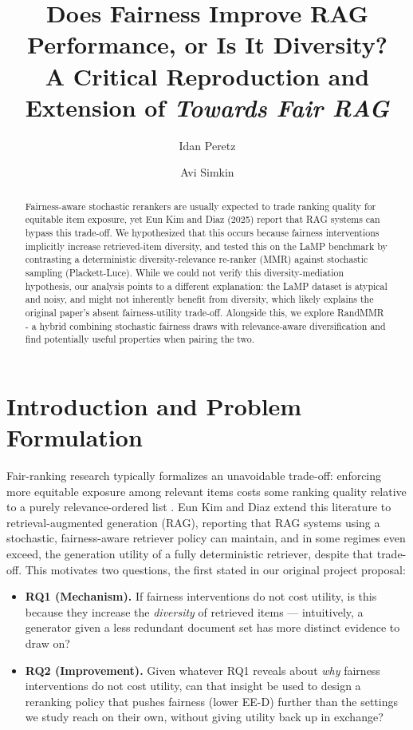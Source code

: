 \documentclass[10pt,twocolumn]{article}
\title{\vspace{-1.2em}Does Fairness Improve RAG Performance, or Is It Diversity?\\
\large A Critical Reproduction and Extension of \emph{Towards Fair RAG}\vspace{-0.3em}}
\author{Idan Peretz}
\author{Avi Simkin}
\affil{\normalsize \{308560150, 312485816\}}
\date{}
\begin{document}
\maketitle
\vspace{-2.2em}

\begin{abstract}
\noindent
Fairness-aware stochastic rerankers are usually expected to trade ranking quality for equitable item exposure,
yet Eun Kim and Diaz (2025) report that RAG systems can  bypass this trade-off.
We hypothesized that this occurs because fairness interventions implicitly increase retrieved-item diversity,
and tested this on the LaMP benchmark by contrasting a deterministic diversity-relevance re-ranker (MMR) against stochastic sampling (Plackett-Luce).
While we could not verify this diversity-mediation hypothesis, our analysis points to a different explanation: the LaMP dataset is atypical and noisy,
and might not inherently benefit from diversity, which likely explains the original paper's absent fairness-utility trade-off.
Alongside this, we explore RandMMR - a hybrid combining stochastic fairness draws with relevance-aware diversification and find potentially useful properties when pairing the two.\end{abstract}
\vspace{0.3em}

\section{Introduction and Problem Formulation}
\label{sec:intro}

Fair-ranking research typically formalizes an unavoidable trade-off: enforcing more
equitable exposure among relevant items costs some ranking quality relative to a
purely relevance-ordered list \cite{castillo2018fairness,diaz2020evaluating}.
Eun Kim and Diaz \cite{eunkim2025fairrag} extend this literature to
retrieval-augmented generation (RAG), reporting that RAG systems using a stochastic,
fairness-aware retriever policy can maintain, and in some regimes even exceed, the
generation utility of a fully deterministic retriever, despite that trade-off. This
motivates two questions, the first stated in our original project proposal:

\begin{itemize}[leftmargin=1.1em]
  \item \textbf{RQ1 (Mechanism).} If fairness interventions do not cost utility, is
  this because they increase the \emph{diversity} of retrieved items --- intuitively,
  a generator given a less redundant document set has more distinct evidence to draw
  on?
  \item \textbf{RQ2 (Improvement).} Given whatever RQ1 reveals about \emph{why}
  fairness interventions do not cost utility, can that insight be used to design a
  reranking policy that pushes fairness (lower EE-D) further than the settings we
  study reach on their own, without giving utility back up in exchange?
\end{itemize}
\end{document}
